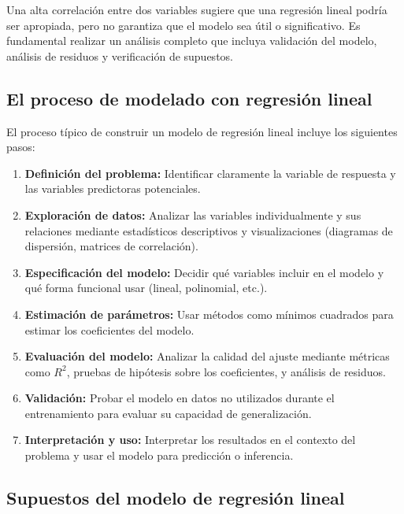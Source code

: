 \begin{observacion}
	Una alta correlación entre dos variables sugiere que una regresión lineal podría ser apropiada, pero no garantiza que el modelo sea útil o significativo. Es fundamental realizar un análisis completo que incluya validación del modelo, análisis de residuos y verificación de supuestos.
\end{observacion}

\subsection{El proceso de modelado con regresión lineal}

El proceso típico de construir un modelo de regresión lineal incluye los siguientes pasos:

\begin{enumerate}
	\item \textbf{Definición del problema:} Identificar claramente la variable de respuesta y las variables predictoras potenciales.
	
	\item \textbf{Exploración de datos:} Analizar las variables individualmente y sus relaciones mediante estadísticos descriptivos y visualizaciones (diagramas de dispersión, matrices de correlación).
	
	\item \textbf{Especificación del modelo:} Decidir qué variables incluir en el modelo y qué forma funcional usar (lineal, polinomial, etc.).
	
	\item \textbf{Estimación de parámetros:} Usar métodos como mínimos cuadrados para estimar los coeficientes del modelo.
	
	\item \textbf{Evaluación del modelo:} Analizar la calidad del ajuste mediante métricas como $R^2$, pruebas de hipótesis sobre los coeficientes, y análisis de residuos.
	
	\item \textbf{Validación:} Probar el modelo en datos no utilizados durante el entrenamiento para evaluar su capacidad de generalización.
	
	\item \textbf{Interpretación y uso:} Interpretar los resultados en el contexto del problema y usar el modelo para predicción o inferencia.
\end{enumerate}

\subsection{Supuestos del modelo de regresión lineal}

